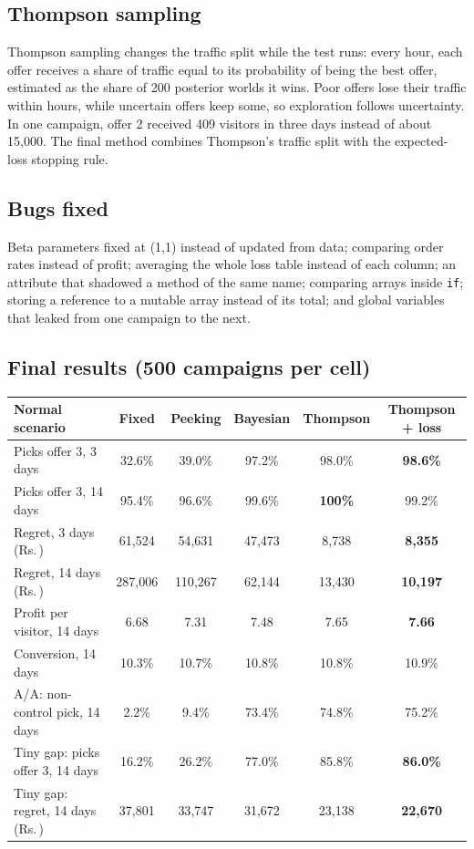 \documentclass[11pt,a4paper]{article}
\newcommand{\Rs}{Rs.\,}
\newcommand{\jpart}[1]{\subsection*{#1}}
\newcommand{\code}[1]{\texttt{#1}}
\begin{document}
\jpart{Thompson sampling}
Thompson sampling changes the traffic split while the test runs: every hour, each offer receives a share
of traffic equal to its probability of being the best offer, estimated as the share of 200 posterior
worlds it wins. Poor offers lose their traffic within hours, while uncertain offers keep some, so
exploration follows uncertainty. In one campaign, offer 2 received 409 visitors in three days instead of
about 15{,}000. The final method combines Thompson's traffic split with the expected-loss stopping rule.

\jpart{Bugs fixed}
Beta parameters fixed at (1,1) instead of updated from data; comparing order rates instead of profit;
averaging the whole loss table instead of each column; an attribute that shadowed a method of the same
name; comparing arrays inside \code{if}; storing a reference to a mutable array instead of its total; and
global variables that leaked from one campaign to the next.

\jpart{Final results (500 campaigns per cell)}
\begin{center}
\small
\begin{tabular}{lccccc}
\toprule
Normal scenario & Fixed & Peeking & Bayesian & Thompson & Thompson + loss \\
\midrule
Picks offer 3, 3 days       & 32.6\% & 39.0\% & 97.2\% & 98.0\% & \textbf{98.6\%} \\
Picks offer 3, 14 days      & 95.4\% & 96.6\% & 99.6\% & \textbf{100\%} & 99.2\% \\
Regret, 3 days (\Rs)        & 61{,}524 & 54{,}631 & 47{,}473 & 8{,}738 & \textbf{8{,}355} \\
Regret, 14 days (\Rs)       & 287{,}006 & 110{,}267 & 62{,}144 & 13{,}430 & \textbf{10{,}197} \\
Profit per visitor, 14 days & 6.68 & 7.31 & 7.48 & 7.65 & \textbf{7.66} \\
Conversion, 14 days         & 10.3\% & 10.7\% & 10.8\% & 10.8\% & 10.9\% \\
\midrule
A/A: non-control pick, 14 days & 2.2\% & 9.4\% & 73.4\% & 74.8\% & 75.2\% \\
Tiny gap: picks offer 3, 14 days & 16.2\% & 26.2\% & 77.0\% & 85.8\% & \textbf{86.0\%} \\
Tiny gap: regret, 14 days (\Rs)  & 37{,}801 & 33{,}747 & 31{,}672 & 23{,}138 & \textbf{22{,}670} \\
\bottomrule
\end{tabular}
\end{center}
\end{document}
